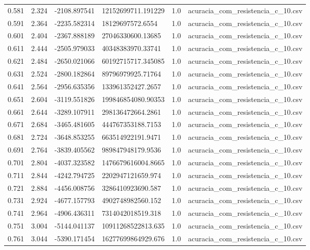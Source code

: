 \begin{table}
\begin{tabular}{llllll}
0.581 & 2.324 & -2108.897541 & 12152699711.191229 & 1.0 & acuracia\_com\_resistencia\_c\_10.csv \\
0.591 & 2.364 & -2235.582314 & 18129697572.6554 & 1.0 & acuracia\_com\_resistencia\_c\_10.csv \\
0.601 & 2.404 & -2367.888189 & 27046330600.13685 & 1.0 & acuracia\_com\_resistencia\_c\_10.csv \\
0.611 & 2.444 & -2505.979033 & 40348383970.33741 & 1.0 & acuracia\_com\_resistencia\_c\_10.csv \\
0.621 & 2.484 & -2650.021066 & 60192715717.345085 & 1.0 & acuracia\_com\_resistencia\_c\_10.csv \\
0.631 & 2.524 & -2800.182864 & 89796979925.71764 & 1.0 & acuracia\_com\_resistencia\_c\_10.csv \\
0.641 & 2.564 & -2956.635356 & 133961352427.2657 & 1.0 & acuracia\_com\_resistencia\_c\_10.csv \\
0.651 & 2.604 & -3119.551826 & 199846854080.90353 & 1.0 & acuracia\_com\_resistencia\_c\_10.csv \\
0.661 & 2.644 & -3289.107911 & 298136472664.2861 & 1.0 & acuracia\_com\_resistencia\_c\_10.csv \\
0.671 & 2.684 & -3465.481605 & 444767353188.7153 & 1.0 & acuracia\_com\_resistencia\_c\_10.csv \\
0.681 & 2.724 & -3648.853255 & 663514922191.9471 & 1.0 & acuracia\_com\_resistencia\_c\_10.csv \\
0.691 & 2.764 & -3839.405562 & 989847948179.9536 & 1.0 & acuracia\_com\_resistencia\_c\_10.csv \\
0.701 & 2.804 & -4037.323582 & 1476679616004.8665 & 1.0 & acuracia\_com\_resistencia\_c\_10.csv \\
0.711 & 2.844 & -4242.794725 & 2202947121659.974 & 1.0 & acuracia\_com\_resistencia\_c\_10.csv \\
0.721 & 2.884 & -4456.008756 & 3286410923690.587 & 1.0 & acuracia\_com\_resistencia\_c\_10.csv \\
0.731 & 2.924 & -4677.157793 & 4902748982560.152 & 1.0 & acuracia\_com\_resistencia\_c\_10.csv \\
0.741 & 2.964 & -4906.436311 & 7314042018519.318 & 1.0 & acuracia\_com\_resistencia\_c\_10.csv \\
0.751 & 3.004 & -5144.041137 & 10911268522813.635 & 1.0 & acuracia\_com\_resistencia\_c\_10.csv \\
0.761 & 3.044 & -5390.171454 & 16277699864929.676 & 1.0 & acuracia\_com\_resistencia\_c\_10.csv \\

\end{tabular}
\end{table}
